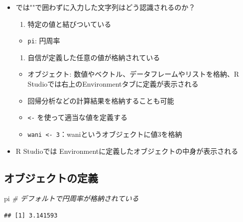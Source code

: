 \documentclass[
]{ltjsarticle}
\newenvironment{Shaded}{\begin{snugshade}}{\end{snugshade}}
\newcommand{\CommentTok}[1]{\textcolor[rgb]{0.56,0.35,0.01}{\textit{#1}}}
\newcommand{\NormalTok}[1]{#1}
\providecommand{\tightlist}{%
  \setlength{\itemsep}{0pt}\setlength{\parskip}{0pt}}
\begin{document}
\begin{itemize}
\tightlist
\item
  では""で囲わずに入力した文字列はどう認識されるのか？

  \begin{enumerate}
  \def\labelenumi{\arabic{enumi}.}
  \tightlist
  \item
    特定の値と結びついている
  \end{enumerate}

  \begin{itemize}
  \tightlist
  \item
    \texttt{pi}: 円周率
  \end{itemize}

  \begin{enumerate}
  \def\labelenumi{\arabic{enumi}.}
  \setcounter{enumi}{1}
  \tightlist
  \item
    自信が定義した任意の値が格納されている
  \end{enumerate}

  \begin{itemize}
  \tightlist
  \item
    オブジェクト: 数値やベクトル、データフレームやリストを格納、R
    Studioでは右上のEnvironmentタブに定義が表示される
  \item
    回帰分析などの計算結果を格納することも可能
  \item
    \texttt{\textless{}-} を使って適当な値を定義する
  \item
    \texttt{wani\ \textless{}-\ 3}：waniというオブジェクトに値3を格納
  \end{itemize}
\item
  R Studioでは Environmentに定義したオブジェクトの中身が表示される
\end{itemize}

\hypertarget{ux30aaux30d6ux30b8ux30a7ux30afux30c8ux306eux5b9aux7fa9}{%
\subsection{オブジェクトの定義}\label{ux30aaux30d6ux30b8ux30a7ux30afux30c8ux306eux5b9aux7fa9}}

\begin{Shaded}
\begin{Highlighting}[]
\NormalTok{pi }\CommentTok{\# デフォルトで円周率が格納されている}
\end{Highlighting}
\end{Shaded}

\begin{verbatim}
## [1] 3.141593
\end{verbatim}
\end{document}

